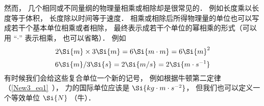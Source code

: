 然而， 几个相同或不同量纲的物理量相乘或相除却是很常见的． 例如长度乘以长度等于体积， 长度除以时间等于速度． 相乘或相除后所得物理量的单位也可以写成若干个基本单位相乘或者相除， 最终表示成若干个单位的幂相乘的形式（可以用 “$\cdot$” 表示相乘， 也可以省略）． 例如
\begin{equation}
2\Si{m} \times 3\Si{m} = 6\Si{m\cdot m} = 6\Si{m}^2
\end{equation}
\begin{equation}
6\Si{m} / 3\Si{s} = 2 \Si{m/s} = 2 \Si{m \cdot s^{-1}}
\end{equation}
有时候我们会给这些复合单位一个新的记号， 例如根据牛顿第二定律（\autoref{New3_eq1}~）， 力的国际单位应该是 $\Si{kg\cdot m\cdot s^{-2}}$， 但我们也可以定义一个等效单位 $\Si{N}$ （牛）．


